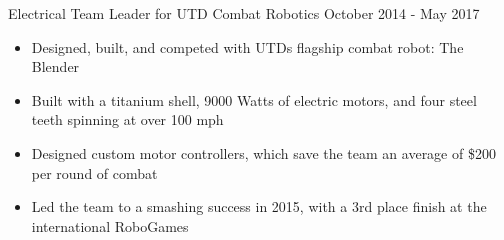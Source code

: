Electrical Team Leader for UTD Combat Robotics
\hfill
October 2014 - May 2017
\begin{itemize}
     \item Designed, built, and competed with UTD\textsc{}s flagship combat robot: The Blender
     \item Built with a titanium shell, 9000 Watts of electric motors, and four steel teeth spinning at over 100 mph
     \item Designed custom motor controllers, which save the team an average of \$200 per round of combat
     \item Led the team to a smashing success in 2015, with a 3rd place finish at the international RoboGames
\end{itemize}
